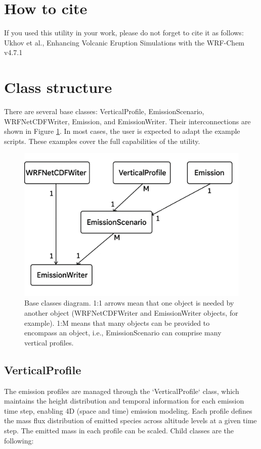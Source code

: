 \documentclass{article}
\begin{document}
\section{How to cite}
If you used this utility in your work, please do not forget to cite it as follows: 
Ukhov et al., Enhancing Volcanic Eruption Simulations with the WRF-Chem v4.7.1

\clearpage
\section{Class structure}
There are several base classes: VerticalProfile, EmissionScenario, WRFNetCDFWriter, Emission, and EmissionWriter. Their interconnections are shown in Figure \ref{fig1}. In most cases, the user is expected to adapt the example scripts. These examples cover the full capabilities of the utility.

\begin{figure}
    \centering
    \includegraphics[width=0.7\linewidth]{./fig1_diagram.png}
    \caption{Base classes diagram. 1:1 arrows mean that one object is needed by another object (WRFNetCDFWriter and EmissionWriter objects, for example). 1:M means that many objects can be provided to encompass an object, i.e., EmissionScenario can comprise many vertical profiles.}
    \label{fig1}
\end{figure}

\subsection{VerticalProfile}
The emission profiles are managed through the `VerticalProfile` class, which maintains the height distribution and temporal information for each emission time step, enabling 4D (space and time) emission modeling. Each profile defines the mass flux distribution of emitted species across altitude levels at a given time step. The emitted mass in each profile can be scaled. Child classes are the following:
\end{document}
